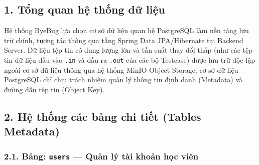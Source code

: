 \documentclass[12pt,a4paper]{article}
\renewcommand{\_}{\BreakableUnderscore}
\begin{document}
\subsection{1. Tổng quan hệ thống dữ liệu}

Hệ thống ByeBug lựa chọn cơ sở dữ liệu quan hệ PostgreSQL làm nền tảng lưu trữ chính, tương tác thông qua tầng Spring Data JPA/Hibernate tại Backend Server. Dữ liệu tệp tin có dung lượng lớn và tần suất thay đổi thấp (như các tệp tin dữ liệu đầu vào \texttt{.in} và đầu ra \texttt{.out} của các bộ Testcase) được lưu trữ độc lập ngoài cơ sở dữ liệu thông qua hệ thống MinIO Object Storage; cơ sở dữ liệu PostgreSQL chỉ chịu trách nhiệm quản lý thông tin định danh (Metadata) và đường dẫn tệp tin (Object Key).

\subsection{2. Hệ thống các bảng chi tiết (Tables Metadata)}

\subsubsection{\texorpdfstring{2.1. Bảng: \texttt{users} --- Quản lý tài khoản học viên}{2.1. Bảng: users --- Quản lý tài khoản học viên}}
\end{document}
